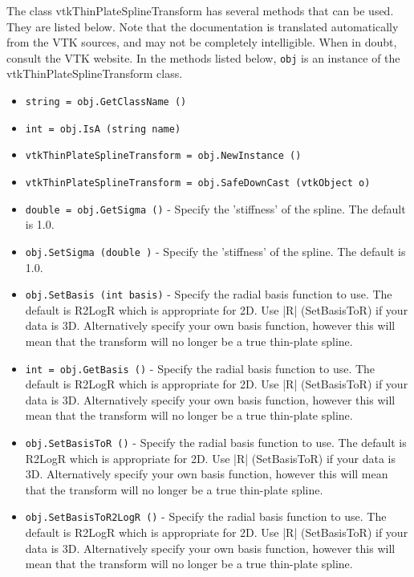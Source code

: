 The class vtkThinPlateSplineTransform has several methods that can be used.
  They are listed below.
Note that the documentation is translated automatically from the VTK sources,
and may not be completely intelligible.  When in doubt, consult the VTK website.
In the methods listed below, \verb|obj| is an instance of the vtkThinPlateSplineTransform class.
\begin{itemize}
\item  \verb|string = obj.GetClassName ()|

\item  \verb|int = obj.IsA (string name)|

\item  \verb|vtkThinPlateSplineTransform = obj.NewInstance ()|

\item  \verb|vtkThinPlateSplineTransform = obj.SafeDownCast (vtkObject o)|

\item  \verb|double = obj.GetSigma ()| -  Specify the 'stiffness' of the spline. The default is 1.0.

\item  \verb|obj.SetSigma (double )| -  Specify the 'stiffness' of the spline. The default is 1.0.

\item  \verb|obj.SetBasis (int basis)| -  Specify the radial basis function to use.  The default is
 R2LogR which is appropriate for 2D. Use |R| (SetBasisToR) 
 if your data is 3D. Alternatively specify your own basis function, 
 however this will mean that the transform will no longer be a true 
 thin-plate spline.

\item  \verb|int = obj.GetBasis ()| -  Specify the radial basis function to use.  The default is
 R2LogR which is appropriate for 2D. Use |R| (SetBasisToR) 
 if your data is 3D. Alternatively specify your own basis function, 
 however this will mean that the transform will no longer be a true 
 thin-plate spline.

\item  \verb|obj.SetBasisToR ()| -  Specify the radial basis function to use.  The default is
 R2LogR which is appropriate for 2D. Use |R| (SetBasisToR) 
 if your data is 3D. Alternatively specify your own basis function, 
 however this will mean that the transform will no longer be a true 
 thin-plate spline.

\item  \verb|obj.SetBasisToR2LogR ()| -  Specify the radial basis function to use.  The default is
 R2LogR which is appropriate for 2D. Use |R| (SetBasisToR) 
 if your data is 3D. Alternatively specify your own basis function, 
 however this will mean that the transform will no longer be a true 
 thin-plate spline.


\end{itemize}
